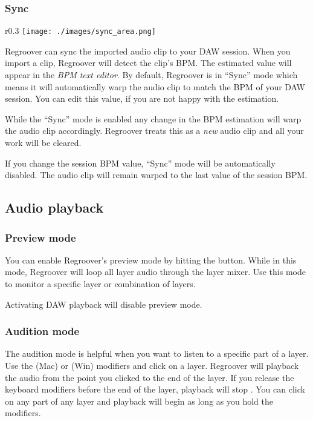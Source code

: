 \documentclass[12pt]{article}
\newcommand{\textimage}[3]{
\raisebox{#1}{\texttt{[image: \#3]}}
}
\begin{document}
\subsubsection*{Sync}
 \begin{wrapfigure}{r}{0.3\textwidth}
\centering
\texttt{[image: ./images/sync\_area.png]}
\end{wrapfigure} Regroover can sync the imported audio clip to your DAW session. When you import a clip, Regroover will  detect the clip's BPM. The estimated value will appear in the \textit{BPM text editor}. By default, Regroover is in ``Sync'' mode which means it will automatically warp the audio clip to match the BPM of your DAW session. You can edit this value, if you are not happy with the estimation. 
\begin{mdframed}[style = warning]
While the ``Sync'' mode is enabled any change in the BPM estimation will warp the audio clip accordingly. Regroover treats this as a \textit{new} audio clip and all your work will be cleared.
\end{mdframed}
If you change the session BPM value, ``Sync'' mode will be automatically disabled. The audio clip will remain warped to the last value of the session BPM.

\subsection*{Audio playback}
\subsubsection*{Preview mode}
You can enable Regroover's preview mode by hitting the \textimage{-7pt}{0.8}{./images/preview_button.png} button. While in this mode, Regroover will loop all layer audio through the layer mixer. Use this mode to monitor a specific layer or combination of layers.
\begin{mdframed}[style = info]
Activating DAW playback will disable preview mode.
\end{mdframed}

\subsubsection*{Audition mode}
The audition mode is helpful when you want to listen to a specific part of a layer. Use the \keys{\shift + \cmd} (Mac) or \keys{\shift + \ctrl} (Win) modifiers and click on a layer. Regroover will playback the audio from the point you clicked to the end of the layer. If you release the keyboard modifiers before the end of the layer, playback will stop . You can click on any part of any layer and playback will begin as long as you hold the modifiers.
\end{document}
